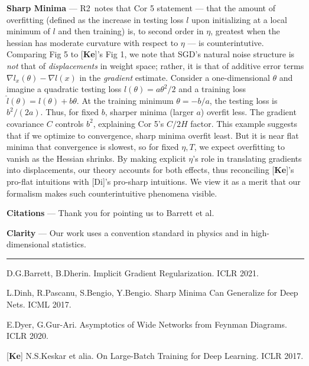 \documentclass{article}
\newcommand{\Rb}{\textmd{\textsf{\color{green!50}  {R2}}}}
\newcommand{\cor}[1]{\textmd{\textsf{Cor #1}}}
\newcommand{\fig}[1]{\textmd{\textsf{Fig #1}}}
\newcommand{\cit}[1]{[\textbf{#1}]}
\newcommand{\moosect}[1]{\par\noindent\textbf{#1} ---}
\newcommand{\offive}[1]{
    {\tiny
        \raisebox{-0.04cm}{\color{gray}\scalebox{2.5}{$\substack{
            \ifthenelse{\equal{#1}{0}}{{\color{moor}\blacksquare}}{\square} 
        }$}}%
        \raisebox{0.04cm}{$\substack{
            \IfSubStr{#1}{1}{{\color{moor}\blacksquare}}{\square}   
            \IfSubStr{#1}{1}{{\color{moor}\blacksquare}}{\square} \\
            \IfSubStr{#1}{2}{{\color{moor}\blacksquare}}{\square}    
            \IfSubStr{#1}{2}{{\color{moor}\blacksquare}}{\square}    
        }$}%
    }%
}
\begin{document}
\moosect{Sharp Minima}
    \Rb\ notes that \cor{5} statement --- that the amount of overfitting
    (defined as the increase in testing loss $l$ upon initializing at a local
    minimum of $l$ and then training) is, to second order in $\eta$, greatest
    when the hessian has moderate curvature with respect to $\eta$ --- is
    counterintutive.
    Comparing \fig{5 \offive{1}} to \cit{Ke}'s \fig{1}, we note that SGD's
    natural noise structure is \emph{not} that of \emph{displacements} in
    weight space; rather, it is that of additive error terms $\nabla
    l_x(\theta)-\nabla l(x)$ in the \emph{gradient} estimate.
    Consider a one-dimensional $\theta$ and imagine a quadratic testing loss
    $l(\theta)=a \theta^2/2$ and a training loss $\hat
    l(\theta)=l(\theta)+b\theta$.  At the training minimum $\theta=-b/a$, the
    testing loss is $b^2/(2a)$.  Thus, for fixed $b$, sharper minima (larger
    $a$) overfit less.  The gradient covariance $C$ controls $b^2$,
    explaining \cor{5}'s $C/2H$ factor.  This example suggests that if we
    optimize to convergence, sharp minima overfit least.
    But it is near flat minima that
    convergence is slowest, so for fixed $\eta, T$, we expect
    overfitting to vanish as the Hessian shrinks.  By making explicit $\eta$'s
    role in translating gradients into displacements, our theory accounts for
    both effects, thus reconciling \cit{Ke}'s pro-flat intuitions with 
    [Di]'s pro-sharp intuitions.
    We view it as a merit that our formalism makes such counterintuitive
    phenomena visible.
    
\moosect{Citations}
    Thank you for pointing us to Barrett et al.  
    
\moosect{Clarity}
    Our work uses a convention standard in physics and in high-dimensional
    statistics. 

\par\noindent
\vspace{0.1cm}
\hrule

    \noindent
    \cit{Ba} D.G.Barrett, B.Dherin.  Implicit Gradient Regularization.  ICLR 2021.

    \noindent
    \cit{Di} L.Dinh, R.Pascanu, S.Bengio, Y.Bengio.  Sharp Minima Can Generalize for Deep Nets.  ICML 2017.

    \noindent
    \cit{Dy} E.Dyer, G.Gur-Ari.  Asymptotics of Wide Networks from Feynman Diagrams.  ICLR 2020.

    \noindent
    \cit{Ke} N.S.Keskar et alia.  On Large-Batch Training for Deep Learning.  ICLR 2017.
\end{document}
